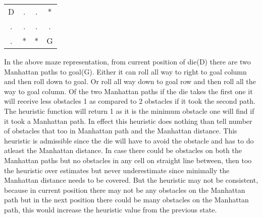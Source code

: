 \documentclass[12pt]{article}
\begin{document}
\begin{enumerate}
\begin{tabular}{c c c c}
		D & . & . & * \\
		. & . & . & . \\
		. & * & * & G \\
	\end{tabular} \newline
	In the above maze representation, from current position of die(D) there are two Manhattan paths to goal(G). Either it can roll all way to right to goal column and then roll down to goal. Or roll all way down to goal row and then roll all the way to goal column. Of the two Manhattan paths if the die takes the first one it will receive less obstacles 1 as compared to 2 obstacles if it took the second  path. The heuristic function will return 1 as it is the minimum obstacle one will find if it took a Manhattan path. In effect this heuristic does nothing than tell number of obstacles that too in Manhattan path and the Manhattan distance.
	This heuristic is admissible since the die will have to avoid the obstacle and has to do atleast the Manhattan distance. In case there could be obstacles on both the Manhattan paths but no obstacles in any cell on straight line between, then too the heuristic over estimates but never underestimate since minimally the Manhattan distance needs to be covered.
	But the heuristic may not be consistent, because in current position there may not be any obstacles on the Manhattan path but in the next position there could be many obstacles on the Manhattan path, this would increase the heuristic value from the previous state.
\end{enumerate}
\end{document}
